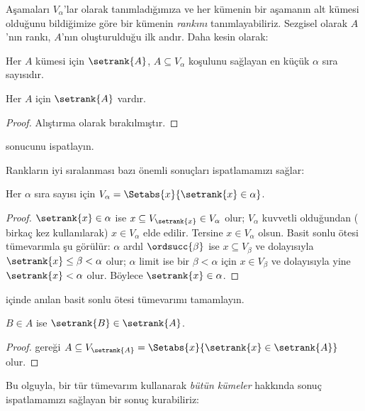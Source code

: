 


Aşamaları $V_\alpha$'lar olarak tanımladığımıza ve her kümenin bir aşamanın
alt kümesi olduğunu bildiğimize göre bir kümenin \emph{rankını}
tanımlayabiliriz. Sezgisel olarak $A$'nın rankı, $A$'nın oluşturulduğu ilk
andır. Daha kesin olarak:

\begin{defn}
Her $A$ kümesi için $\setrank{A}$, $A\subseteq V_\alpha$ koşulunu sağlayan
en küçük $\alpha$ sıra sayısıdır.
\end{defn}
\begin{prop}
	Her $A$ için $\setrank{A}$ vardır.
\end{prop}
\begin{proof}
	Alıştırma olarak bırakılmıştır.
\end{proof}
\begin{prob}
	 sonucunu ispatlayın.
\end{prob}
\noindent
Rankların iyi sıralanması bazı önemli sonuçları ispatlamamızı sağlar:
\begin{prop}
Her $\alpha$ sıra sayısı için
$V_\alpha=\Setabs{x}{\setrank{x}\in\alpha}$.
\end{prop}

\begin{proof}
$\setrank{x}\in\alpha$ ise
$x\subseteq V_{\setrank{x}}\in V_\alpha$ olur; $V_\alpha$ kuvvetli
olduğundan ( birkaç kez kullanılarak)
$x\in V_\alpha$ elde edilir. Tersine $x\in V_\alpha$ olsun. Basit sonlu
ötesi tümevarımla şu görülür: $\alpha$ ardıl $\ordsucc{\beta}$ ise
$x\subseteq V_\beta$ ve dolayısıyla $\setrank{x}\leq\beta<\alpha$ olur;
$\alpha$ limit ise bir $\beta<\alpha$ için $x\in V_\beta$ ve dolayısıyla
yine $\setrank{x}<\alpha$ olur. Böylece $\setrank{x}\in\alpha$.
\end{proof}
\begin{prob}
	 içinde anılan basit sonlu ötesi
	tümevarımı tamamlayın.
\end{prob}

\begin{prop}
$B\in A$ ise $\setrank{B}\in\setrank{A}$.
\end{prop}

\begin{proof}
 gereği
$A\subseteq V_{\setrank{A}}=
\Setabs{x}{\setrank{x}\in\setrank{A}}$ olur.
\end{proof}
\noindent
Bu olguyla, bir tür tümevarım kullanarak \emph{bütün kümeler} hakkında
sonuç ispatlamamızı sağlayan bir sonuç kurabiliriz:

